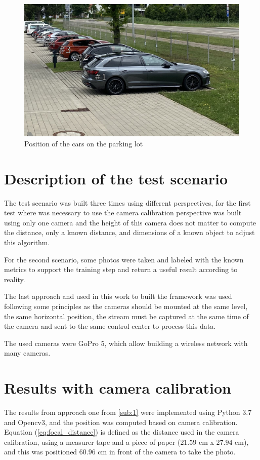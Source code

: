 \begin{figure}[H]
\centering
\includegraphics[scale=0.5]{imagens/park.JPG}
\caption{Position of the cars on the parking lot}
\label{fig:park}
\end{figure}

\section{Description of the test scenario}

The test scenario was built three times using different perspectives, for the first test where was necessary to use the camera calibration perspective was built using only one camera and the height of this camera does not matter to compute the distance, only a known distance, and dimensions of a known object to adjust this algorithm.

For the second scenario, some photos were taken and labeled with the known metrics to support the training step and return a useful result according to reality. 

The last approach and used in this work to built the framework was used following some principles as the cameras should be mounted at the same level, the same horizontal position,  the stream must be captured at the same time of the camera and sent to the same control center to process this data. 

The used cameras were GoPro 5, which allow building a wireless network with many cameras. 


\section{Results with camera calibration}

The results from approach one from \ref{sub:1} were implemented using Python 3.7 and Opencv3, and the position was computed based on camera calibration. Equation (\ref{eq:focal_distance}) is defined as the distance used in the camera calibration, using a measurer tape and a piece of paper ($21.59$ cm x  $27.94$ cm), and this was positioned $60.96$ cm in front of the camera to take the photo.


